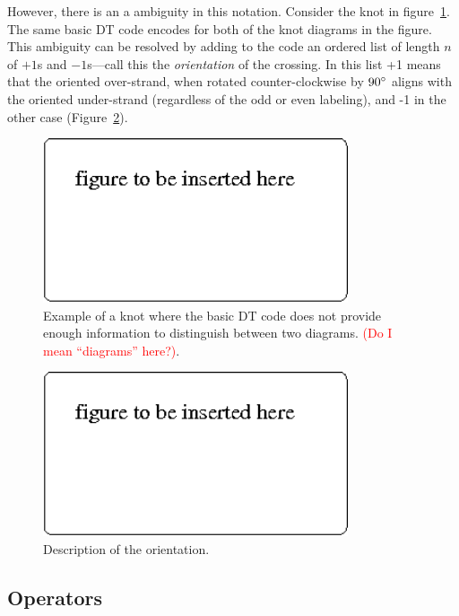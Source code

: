 \documentclass[a4paper,fleqn,11pt]{article}
\begin{document}
However, there is an a ambiguity in this notation. Consider the knot
in figure~\ref{fi:ambiguous}. The same basic DT code encodes for both
of the knot diagrams in the figure. This ambiguity can be resolved by
adding to the code an ordered list of length $n$ of $+1$s and
$-1$s---call this the \emph{orientation} of the crossing. In this list
+1 means that the oriented over-strand, when rotated counter-clockwise
by $90\degree$ aligns with the oriented under-strand (regardless of
the odd or even labeling), and -1 in the other case
(Figure~\ref{fi:orientation}).

\begin{figure}
  \includegraphics[width=90mm]{blank.png}
  \caption{Example of a knot where the basic DT code does not provide
    enough information to distinguish between two
    diagrams. \textcolor{red}{(Do I mean ``diagrams'' here?)}.}
  \label{fi:ambiguous}
\end{figure}

\begin{figure}
  \includegraphics[width=90mm]{blank.png}
  \caption{Description of the orientation.}
  \label{fi:orientation}
\end{figure}

\subsection{Operators}
\end{document}
